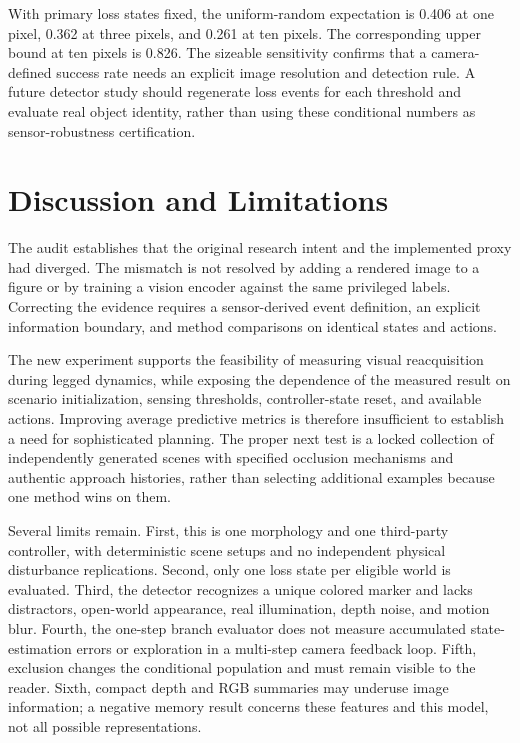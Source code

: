 \documentclass[10pt,twocolumn,a4paper]{article}
\begin{document}
With primary loss states fixed, the uniform-random expectation is 0.406 at one pixel, 0.362 at three pixels, and 0.261 at ten pixels. The corresponding upper bound at ten pixels is 0.826. The sizeable sensitivity confirms that a camera-defined success rate needs an explicit image resolution and detection rule. A future detector study should regenerate loss events for each threshold and evaluate real object identity, rather than using these conditional numbers as sensor-robustness certification.

\section{Discussion and Limitations}
The audit establishes that the original research intent and the implemented proxy had diverged. The mismatch is not resolved by adding a rendered image to a figure or by training a vision encoder against the same privileged labels. Correcting the evidence requires a sensor-derived event definition, an explicit information boundary, and method comparisons on identical states and actions.

The new experiment supports the feasibility of measuring visual reacquisition during legged dynamics, while exposing the dependence of the measured result on scenario initialization, sensing thresholds, controller-state reset, and available actions. Improving average predictive metrics is therefore insufficient to establish a need for sophisticated planning. The proper next test is a locked collection of independently generated scenes with specified occlusion mechanisms and authentic approach histories, rather than selecting additional examples because one method wins on them.

Several limits remain. First, this is one morphology and one third-party controller, with deterministic scene setups and no independent physical disturbance replications. Second, only one loss state per eligible world is evaluated. Third, the detector recognizes a unique colored marker and lacks distractors, open-world appearance, real illumination, depth noise, and motion blur. Fourth, the one-step branch evaluator does not measure accumulated state-estimation errors or exploration in a multi-step camera feedback loop. Fifth, exclusion changes the conditional population and must remain visible to the reader. Sixth, compact depth and RGB summaries may underuse image information; a negative memory result concerns these features and this model, not all possible representations.
\end{document}
